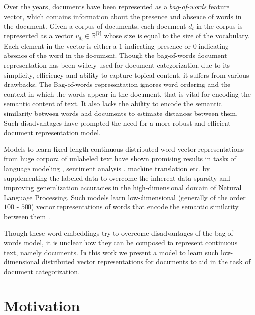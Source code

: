 Over the years, documents have been represented as a \emph{bag-of-words} 
feature vector, which contains information about the presence and 
absence of words in the document. Given a corpus of documents, each 
document $d_{i}$ in the corpus is represented as a vector 
$v_{d_{i}} \in \mathbb{R}^{|V|}$ whose size is equal to the size of 
the vocabulary. Each element in the vector is either a $1$ indicating
presence or $0$ indicating absence of the word in the document. 
Though the bag-of-words document representation has been widely used for 
document categorization due to its simplicity, efficiency and ability 
to capture topical content, it suffers from various drawbacks. The 
Bag-of-words representation ignores word ordering and the context in 
which the words appear in the document, that is vital for encoding the 
semantic content of text. It also lacks the ability to encode the 
semantic similarity between words and documents to estimate distances between them. Such disadvantages have prompted the need for a 
more robust and efficient document representation model.

Models to learn fixed-length continuous distributed word vector 
representations from huge corpora of unlabeled text have shown 
promising results in tasks of language modeling \cite{bengio2003neural},
sentiment analysis \cite{socher2013recursive}, machine translation
\cite{zou2013bilingual} etc. by supplementing the labeled data to 
overcome the inherent data sparsity and improving generalization 
accuracies in the high-dimensional domain of Natural Language 
Processing. Such models learn low-dimensional (generally of the order 
$100$ - $500$) vector representations of words that encode the 
semantic similarity between them \citep{mikolov2013efficient}. 

Though these word embeddings try to overcome disadvantages of the bag-of-words model, it is unclear how they can be composed to represent 
continuous text, namely documents. In this work we present a model to learn such low-dimensional distributed vector representations for documents to aid in the task of document categorization.

 
\section{Motivation}

